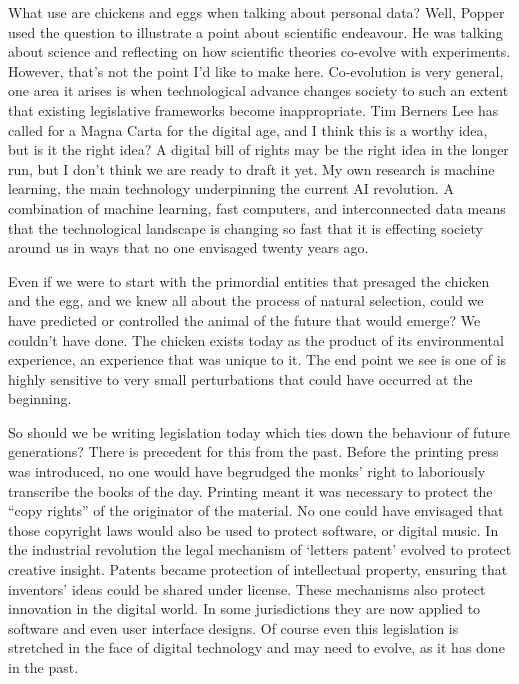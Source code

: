 \documentclass[a4paper]{caesar_book}
\begin{document}
What use are chickens and eggs when talking about personal data? Well, Popper used the question to illustrate a point about scientific endeavour. He was talking about science and reflecting on how scientific theories co-evolve with experiments. However, that’s not the point I’d like to make here. Co-evolution is very general, one area it arises is when technological advance changes society to such an extent that existing legislative frameworks become inappropriate. Tim Berners Lee has called for a Magna Carta for the digital age, and I think this is a worthy idea, but is it the right idea? A digital bill of rights may be the right idea in the longer run, but I don’t think we are ready to draft it yet. My own research is machine learning, the main technology underpinning the current AI revolution. A combination of machine learning, fast computers, and interconnected data means that the technological landscape is changing so fast that it is effecting society around us in ways that no one envisaged twenty years ago.

Even if we were to start with the primordial entities that presaged the chicken and the egg, and we knew all about the process of natural selection, could we have predicted or controlled the animal of the future that would emerge? We couldn't have done. The chicken exists today as the product of its environmental experience, an experience that was unique to it. The end point we see is one of is highly sensitive to very small perturbations that could have occurred at the beginning.

So should we be writing legislation today which ties down the behaviour of future generations? There is precedent for this from the past. Before the printing press was introduced, no one would have begrudged the monks’ right to laboriously transcribe the books of the day. Printing meant it was necessary to protect the ``copy rights'' of the originator of the material. No one could have envisaged that those copyright laws would also be used to protect software, or digital music. In the industrial revolution the legal mechanism of ‘letters patent’ evolved to protect creative insight. Patents became protection of intellectual property, ensuring that inventors’ ideas could be shared under license. These mechanisms also protect innovation in the digital world. In some jurisdictions they are now applied to software and even user interface designs. Of course even this legislation is stretched in the face of digital technology and may need to evolve, as it has done in the past.
\end{document}
